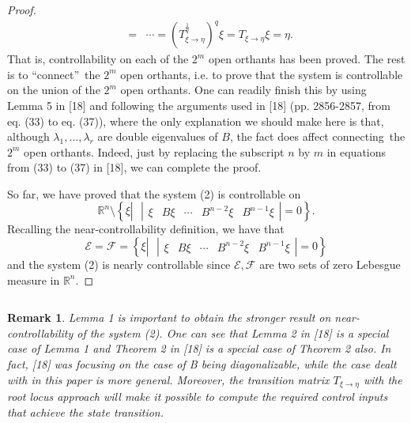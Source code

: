 \documentclass[journal,a4paper,12pt,onecolumn]{IEEEtran}
\newtheorem{remark}[theorem]{Remark}
\begin{document}
\begin{proof}
\begin{eqnarray*}
&=&\cdots =\left( T_{\xi \rightarrow \eta }^{\frac{1}{q}}\right) ^{q}\xi
=T_{\xi \rightarrow \eta }\xi =\eta .
\end{eqnarray*}That is, controllability on each of the $2^{m}$ open orthants has been
proved. The rest is to \textquotedblleft connect\textquotedblright\ the $2^{m}$ open orthants, i.e. to prove that the system is controllable on the
union of the $2^{m}$ open orthants. One can readily finish this by using
Lemma 5 in [18] and following the arguments used in [18] (pp. 2856-2857,
from eq. (33) to eq. (37)), where the only explanation we should make here
is that, although $\lambda _{1},\ldots ,\lambda _{r}$ are double eigenvalues
of $B$, the fact does affect connecting\ the $2^{m}$ open orthants. Indeed,
just by replacing the subscript $n$ by $m$ in equations from (33) to (37) in
[18], we can complete the proof.

So far, we have proved that the system (2) is controllable on\begin{equation}
\mathbb{R}
^{n}\setminus \left\{ \xi \left\vert \text{ }\left\vert
\begin{array}{ccccc}
\xi & B\xi & \cdots & B^{n-2}\xi & B^{n-1}\xi \end{array}\right\vert =0\right. \right\} .
\end{equation}Recalling the near-controllability definition, we have that\begin{equation*}
\mathcal{E}=\mathcal{F}=\left\{ \xi \left\vert \text{ }\left\vert
\begin{array}{ccccc}
\xi & B\xi & \cdots & B^{n-2}\xi & B^{n-1}\xi \end{array}\right\vert =0\right. \right\}
\end{equation*}and the system (2) is nearly controllable since $\mathcal{E},\mathcal{F}$
are two sets of zero Lebesgue measure in $\mathbb{R}
^{n}$.
\end{proof}

$\left. {}\right. $

\begin{remark}
Lemma 1 is important to obtain the stronger result on near-controllability
of the system (2). One can see that Lemma 2 in [18] is a special case of
Lemma 1 and Theorem 2 in [18] is a special case of Theorem 2 also. In fact,
[18] was focusing on the case of B being diagonalizable, while the case
dealt with in this paper is more general. Moreover, the \textit{transition}
matrix $T_{\xi \rightarrow \eta }$ with the root locus approach will make it
possible to compute the required control inputs that achieve the state
transition.
\end{remark}
\end{document}
